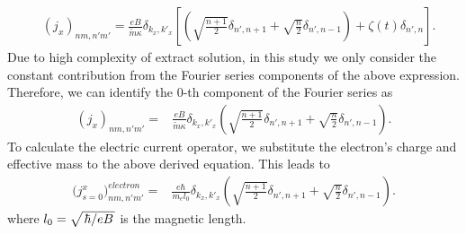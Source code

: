 \documentclass{article}
\begin{document}
\begin{itemize}
{\begin{equation}
    \begin{aligned}
      &\left({j}_x \right)_{nm,n'm'} =
      \frac{eB}{{\widetilde{m}\kappa}}
      \delta_{k_x,k'_x}
      \left[
      \left(\sqrt{\frac{n+1}{2}} \delta_{n',n+1} + \sqrt{\frac{n}{2}}
      \delta_{n',n-1}\right)
      + \zeta(t) \delta_{n',n}
      \right].
    \end{aligned}
  \end{equation}
  Due to high complexity of extract solution, in this study we only consider the constant contribution from the Fourier series components of the above expression. Therefore, we can identify the $0$-th component of the Fourier series as
  \begin{equation} \tag{D11}
    \begin{aligned}
        \left({j}_x \right)_{nm,n'm'} =&
        \frac{eB}{\widetilde{m}\kappa}
        \delta_{k_x,k'_x}
        \left(\sqrt{\frac{n+1}{2}} \delta_{n',n+1} + \sqrt{\frac{n}{2}}
        \delta_{n',n-1} \right).
    \end{aligned}
  \end{equation}
  To calculate the electric current operator, we substitute the electron's charge and effective mass to the above derived equation. This leads to
  \begin{equation} \tag{D12}
    \begin{aligned}
        \Big({j}^x_{s=0}\Big)_{nm,n'm'}^{electron}  =&
        \frac{e\hbar}{{m_e}l_0}
        \delta_{k_x,k'_x}
        \left(\sqrt{\frac{n+1}{2}} \delta_{n',n+1} + \sqrt{\frac{n}{2}}
        \delta_{n',n-1} \right).
    \end{aligned}
  \end{equation}
  where $l_0 = \sqrt{\flatfrac{\hbar}{eB}}$ is the magnetic length.

}
\end{itemize}
\end{document}

